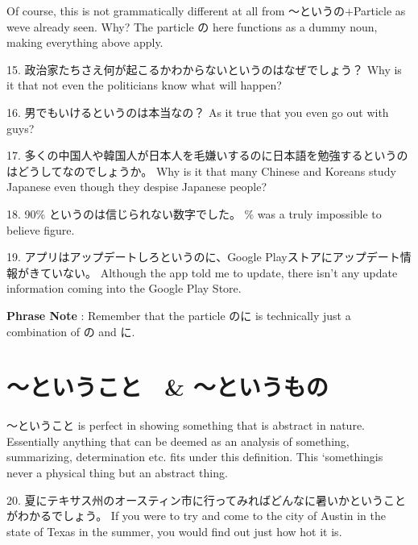 \par{ Of course, this is not grammatically different at all from ～というの+Particle as we\textquotesingle ve already seen. Why? The particle の here functions as a dummy noun, making everything above apply. }
 
\par{15. 政治家たちさえ何が起こるかわからないというのはなぜでしょう？ \hfill\break
Why is it that not even the politicians know what will happen? }
 
\par{16. 男でもいけるというのは本当なの？ \hfill\break
As it true that you even go out with guys? }
 
\par{17. 多くの中国人や韓国人が日本人を毛嫌いするのに日本語を勉強するというのはどうしてなのでしょうか。 \hfill\break
Why is it that many Chinese and Koreans study Japanese even though they despise Japanese people? }
 
\par{18. 90\% というのは信じられない数字でした。 \hfill{}\% was a truly impossible to believe figure. }
 
\par{19. アプリはアップデートしろというのに、Google Playストアにアップデート情報がきていない。 \hfill\break
Although the app told me to update, there isn't any update information coming into the Google Play Store. }

\par{\textbf{Phrase Note }: Remember that the particle のに is technically just a combination of の and に. }
      
\section{～ということ　\& ～というもの}
 
\par{ ～ということ is perfect in showing something that is abstract in nature. Essentially anything that can be deemed as an analysis of something, summarizing, determination etc. fits under this definition. This ‘something\textquotesingle  is never a physical thing but an abstract thing. }

\par{20. 夏にテキサス州のオースティン市に行ってみればどんなに暑いかということがわかるでしょう。 \hfill\break
If you were to try and come to the city of Austin in the state of Texas in the summer, you would find out just how hot it is. }

